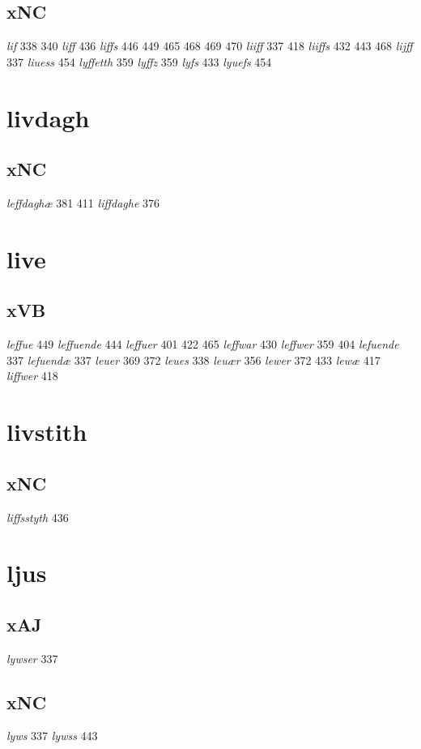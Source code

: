 \documentclass[a4paper,twocolumn]{article}
\begin{document}
\subsection{xNC}
\label{sec:orga8f756f}
\emph{lif} 338 340 \emph{liff} 436 \emph{liffs} 446 449 465 468 469 470 \emph{liiff} 337 418 \emph{liiffs} 432 443 468 \emph{lijff} 337 \emph{liuess} 454 \emph{lyffetth} 359 \emph{lyffz} 359 \emph{lyfs} 433 \emph{lyuefs} 454 
\section{livdagh}
\label{sec:org8b5dcab}
\subsection{xNC}
\label{sec:org602c5ea}
\emph{leffdaghæ} 381 411 \emph{liffdaghe} 376 
\section{live}
\label{sec:org6696c4a}
\subsection{xVB}
\label{sec:orga7860fa}
\emph{leffue} 449 \emph{leffuende} 444 \emph{leffuer} 401 422 465 \emph{leffwar} 430 \emph{leffwer} 359 404 \emph{lefuende} 337 \emph{lefuendæ} 337 \emph{leuer} 369 372 \emph{leues} 338 \emph{leuær} 356 \emph{lewer} 372 433 \emph{lewæ} 417 \emph{liffwer} 418 
\section{livstith}
\label{sec:orgacd9eef}
\subsection{xNC}
\label{sec:org1240cbc}
\emph{liffsstyth} 436 
\section{ljus}
\label{sec:org9eafa5c}
\subsection{xAJ}
\label{sec:org62d93f9}
\emph{lywser} 337 
\subsection{xNC}
\label{sec:org5b25f18}
\emph{lyws} 337 \emph{lywss} 443 
\end{document}
